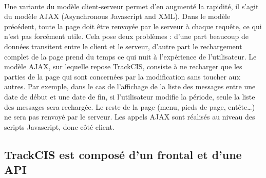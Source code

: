 			\paragraph{}%
			Une variante du modèle client-serveur permet d'en augmenté la rapidité, il
			s'agit du modèle AJAX (Asynchronous Javascript and XML).
			Dans le modèle précédent, toute la page doit être renvoyée par le
			serveur à chaque requête, ce qui n'est pas forcément utile. Cela pose deux
			problèmes :
			d'une part beaucoup de données transitent entre le client et le serveur,
			d'autre part le rechargement complet de la page prend du temps ce qui nuit à
			l'expérience de l'utilisateur.
			Le modèle AJAX, sur lequelle repose TrackCIS, consiste à ne recharger que les
			parties de la page qui sont concernées par la modification sans toucher aux
			autres.
			Par exemple, dans le cas de l'affichage de la liste des messages entre une
			date de début et une date de fin, si l'utilisateur modifie la période, seule
			la liste des messages sera rechargée. Le reste de la page (menu, pieds de
			page, entête\ldots) ne sera pas renvoyé par le serveur. Les appels AJAX sont
			réalisés au niveau des scripts Javascript, donc côté client.
			
		\subsection{TrackCIS est composé d'un frontal et d'une API}

